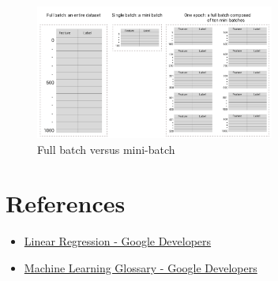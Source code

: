 \documentclass[a4paper,12pt]{article}
\begin{document}
\begin{figure}[H]
    \centering
    \includegraphics[width=0.7\textwidth]{../Images/Linear-Regression/batch-size.png}
    \caption{Full batch versus mini-batch}
    \label{fig:batch-size}
\end{figure}

\section{References}
\begin{itemize}
    \item \href{https://developers.google.com/machine-learning/crash-course/linear-regression}{Linear Regression - Google Developers}
    \item \href{https://developers.google.com/machine-learning/glossary}{Machine Learning Glossary - Google Developers}
\end{itemize}
\end{document}

